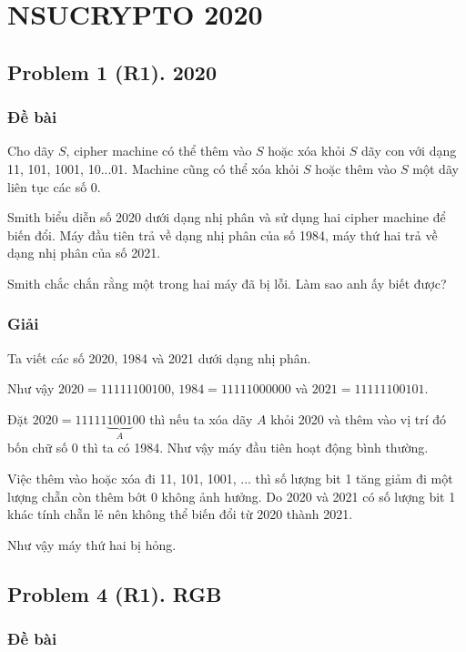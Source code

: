 \chapter*{NSUCRYPTO 2020}

\section*{Problem 1 (R1). 2020}

\subsection*{Đề bài}

Cho dãy $S$, cipher machine có thể thêm vào $S$ hoặc xóa khỏi $S$ dãy con với dạng 11, 101, 1001, 10...01. Machine cũng có thể xóa khỏi $S$ hoặc thêm vào $S$ một dãy liên tục các số 0.

Smith biểu diễn số 2020 dưới dạng nhị phân và sử dụng hai cipher machine để biến đổi. Máy đầu tiên trả về dạng nhị phân của số 1984, máy thứ hai trả về dạng nhị phân của số 2021.

Smith chắc chắn rằng một trong hai máy đã bị lỗi. Làm sao anh ấy biết được?

\subsection*{Giải}

Ta viết các số 2020, 1984 và 2021 dưới dạng nhị phân.

Như vậy $2020 = 11111100100$, $1984 = 11111000000$ và $2021 = 11111100101$.

Đặt $2020 = 11111 \underbrace{1001}_A 00$ thì nếu ta xóa dãy $A$ khỏi 2020 và thêm vào vị trí đó bốn chữ số 0 thì ta có 1984. Như vậy máy đầu tiên hoạt động bình thường.

Việc thêm vào hoặc xóa đi 11, 101, 1001, ... thì số lượng bit 1 tăng giảm đi một lượng chẵn còn thêm bớt 0 không ảnh hưởng. Do 2020 và 2021 có số lượng bit 1 khác tính chẵn lẻ nên không thể biến đổi từ 2020 thành 2021.

Như vậy máy thứ hai bị hỏng.

\section*{Problem 4 (R1). RGB}

\subsection*{Đề bài}

